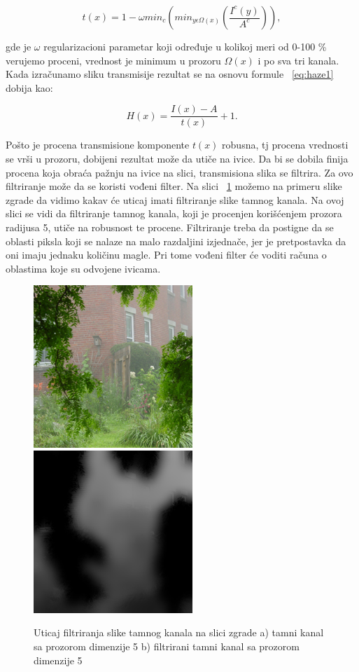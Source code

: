 \documentclass[a4paper,12pt,titlepage]{article}
\begin{document}
\begin{equation}\label{eq:haze3}
t(x) = 1 - \omega min_c ( min_{y \epsilon \Omega (x)} (\dfrac{I^c(y)}{A^c})),
\end{equation}

gde je $\omega$ regularizacioni parametar koji određuje u kolikoj meri od 0-100 \% verujemo proceni, vrednost je minimum u prozoru $\Omega(x)$ i po sva tri kanala. Kada izračunamo sliku transmisije rezultat se na osnovu formule ~\ref{eq:haze1} dobija kao:

\begin{equation}\label{eq:haze3}
H(x) = \dfrac{I(x) - A}{t(x)} + 1.
\end{equation}

Pošto je procena transmisione komponente $t(x)$ robusna, tj procena vrednosti se vrši u prozoru, dobijeni rezultat može da utiče na ivice. Da bi se dobila finija procena koja obraća pažnju na ivice na slici, transmisiona slika se filtrira. Za ovo filtriranje može da se koristi vođeni filter. Na slici ~\ref{FiltriraniTamniKanal} možemo na primeru slike zgrade da vidimo kakav će uticaj imati filtriranje slike tamnog kanala. Na ovoj slici se vidi da filtriranje tamnog kanala, koji je procenjen korišćenjem prozora radijusa 5, utiče na robusnost te procene. Filtriranje treba da postigne da se oblasti piksla koji se nalaze na malo razdaljini izjednače, jer je pretpostavka da oni imaju jednaku količinu magle. Pri tome vođeni filter će voditi računa o oblastima koje su odvojene ivicama. 

\begin{figure}[ht!]
\centering
\includegraphics[width=60mm]{img/haze.png}
\includegraphics[width=60mm]{img/hazeDC5F.png}
\caption{Uticaj filtriranja slike tamnog kanala na slici zgrade a) tamni kanal sa prozorom dimenzije 5 b) filtrirani tamni kanal sa prozorom dimenzije 5}
\label{FiltriraniTamniKanal}
\end{figure} 
\end{document}
